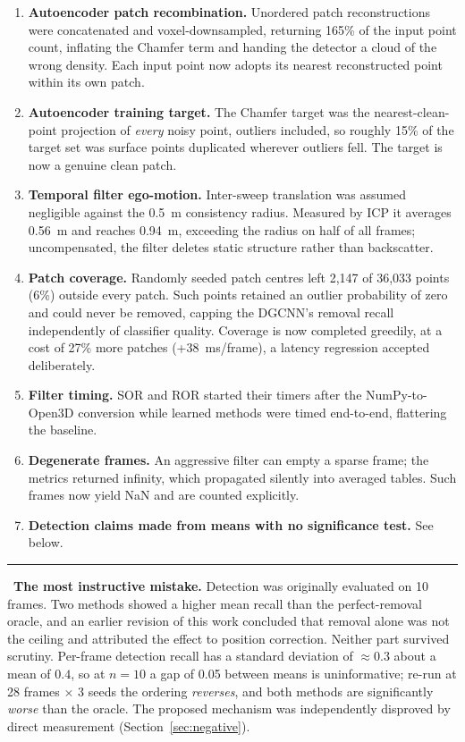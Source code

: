 \documentclass[11pt,a4paper]{article}
\newcommand{\keyfinding}[1]{\medskip\noindent\textcolor{accent}{\rule{2pt}{10pt}}\ \textbf{#1}\medskip}
\begin{document}
\begin{enumerate}\setlength{\itemsep}{3pt}
\item \textbf{Autoencoder patch recombination.} Unordered patch
reconstructions were concatenated and voxel-downsampled, returning 165\% of
the input point count, inflating the Chamfer term and handing the detector
a cloud of the wrong density. Each input point now adopts its nearest
reconstructed point within its own patch.
\item \textbf{Autoencoder training target.} The Chamfer target was the
nearest-clean-point projection of \emph{every} noisy point, outliers
included, so roughly 15\% of the target set was surface points duplicated
wherever outliers fell. The target is now a genuine clean patch.
\item \textbf{Temporal filter ego-motion.} Inter-sweep translation was assumed
negligible against the 0.5~m consistency radius. Measured by ICP it averages
0.56~m and reaches 0.94~m, exceeding the radius on half of all frames;
uncompensated, the filter deletes static structure rather than backscatter.
\item \textbf{Patch coverage.} Randomly seeded patch centres left 2{,}147 of
36{,}033 points (6\%) outside every patch. Such points retained an outlier
probability of zero and could never be removed, capping the DGCNN's removal
recall independently of classifier quality. Coverage is now completed
greedily, at a cost of 27\% more patches (+38~ms/frame), a latency
regression accepted deliberately.
\item \textbf{Filter timing.} SOR and ROR started their timers after the
NumPy-to-Open3D conversion while learned methods were timed end-to-end,
flattering the baseline.
\item \textbf{Degenerate frames.} An aggressive filter can empty a sparse
frame; the metrics returned infinity, which propagated silently into averaged
tables. Such frames now yield NaN and are counted explicitly.
\item \textbf{Detection claims made from means with no significance test.}
See below.
\end{enumerate}

\keyfinding{The most instructive mistake.}
Detection was originally evaluated on 10 frames. Two methods showed a higher
mean recall than the perfect-removal oracle, and an earlier revision of this
work concluded that removal alone was not the ceiling and attributed the
effect to position correction. Neither part survived scrutiny. Per-frame
detection recall has a standard deviation of $\approx 0.3$ about a mean of
$0.4$, so at $n=10$ a gap of 0.05 between means is uninformative; re-run at
28 frames $\times$ 3 seeds the ordering \emph{reverses}, and both methods are
significantly \emph{worse} than the oracle. The proposed mechanism was
independently disproved by direct measurement
(Section~\ref{sec:negative}).
\end{document}
